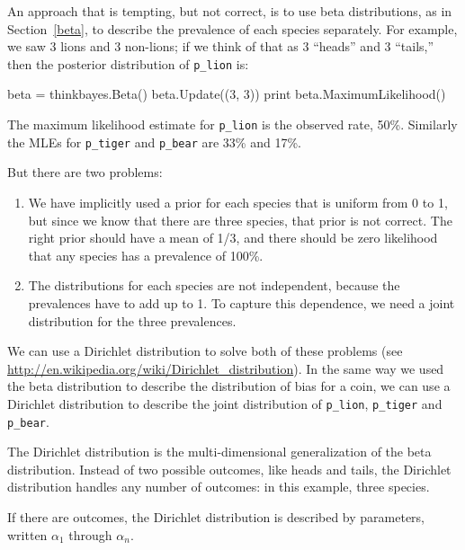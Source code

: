 \documentclass[12pt]{book}
\theoremstyle{exercise}
\begin{document}
An approach that is tempting, but not correct, is to use beta
distributions, as in Section~\ref{beta}, to describe the prevalence of
each species separately.  For example, we saw 3 lions and 3 non-lions;
if we think of that as 3 ``heads'' and 3 ``tails,'' then the posterior
distribution of \verb"p_lion" is:

\begin{code}
    beta = thinkbayes.Beta()
    beta.Update((3, 3))
    print beta.MaximumLikelihood()
\end{code}

The maximum likelihood estimate for \verb"p_lion" is the observed
rate, 50\%.  Similarly the MLEs for \verb"p_tiger" and \verb"p_bear"
are 33\% and 17\%.

But there are two problems:

\begin{enumerate}

\item We have implicitly used a prior for each species that is uniform
  from 0 to 1, but since we know that there are three species, that
  prior is not correct.  The right prior should have a mean of 1/3,
  and there should be zero likelihood that any species has a
  prevalence of 100\%.

\item The distributions for each species are not independent, because
  the prevalences have to add up to 1.  To capture this dependence, we
  need a joint distribution for the three prevalences.

\end{enumerate}

We can use a Dirichlet distribution to solve both of these problems
(see \url{http://en.wikipedia.org/wiki/Dirichlet_distribution}).  In
the same way we used the beta distribution to describe the
distribution of bias for a coin, we can use a Dirichlet
distribution to describe the joint distribution of \verb"p_lion",
\verb"p_tiger" and \verb"p_bear".

The Dirichlet distribution is the multi-dimensional generalization
of the beta distribution.  Instead of two possible outcomes, like
heads and tails, the Dirichlet distribution handles any number of
outcomes: in this example, three species.

If there are  outcomes, the Dirichlet distribution is
described by  parameters, written $\alpha_1$ through $\alpha_n$.
\end{document}
